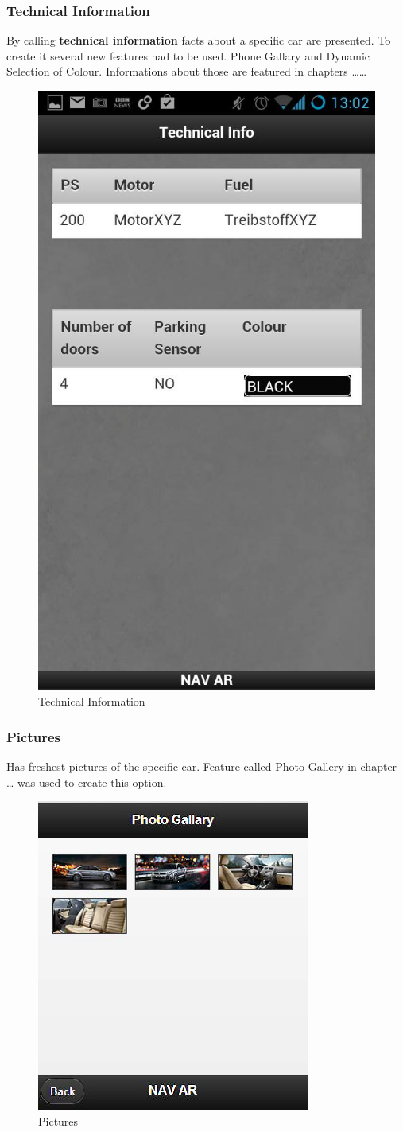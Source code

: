 \subsubsection{Technical Information}
By calling \textbf{technical information} facts about a specific car are presented. To create it several new features had to be used. Phone Gallary and Dynamic Selection of Colour. Informations about those are featured in chapters ……
\\
\begin{figure}[h]
\centering
\includegraphics[width=0.4\linewidth]{graphics/chapter4/6}
\caption{Technical Information}
\label{fig:7}
\end{figure}
\newpage

\subsubsection{Pictures}
Has freshest pictures of the specific car. Feature called Photo Gallery in chapter … was used to create this option.
\\
\begin{figure}[h]
\centering
\includegraphics[width=0.5\linewidth]{graphics/chapter4/7}
\caption{Pictures}
\label{fig:8}
\end{figure}
\newpage

